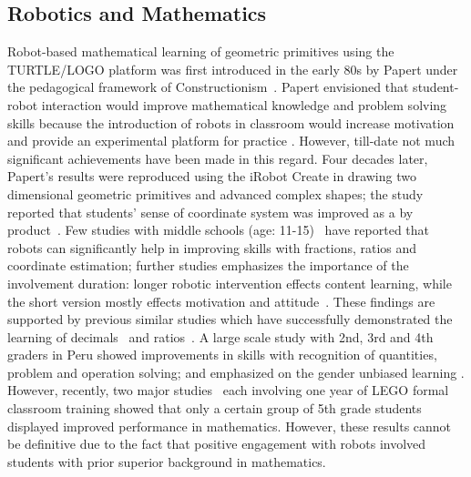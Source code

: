 \documentclass[conference]{IEEEtran}
\begin{document}
\subsection{Robotics and Mathematics}

Robot-based mathematical learning of geometric primitives using the TURTLE/LOGO platform was first introduced in the 
early 80s by Papert under the pedagogical framework of Constructionism~\cite{papert1980mindstorms}. Papert envisioned 
that student-robot interaction would improve mathematical knowledge and problem solving skills because the introduction 
of robots in classroom would increase motivation and provide an experimental platform for practice 
\cite{portsmore2004bringing, ruiz2004robotics, robinson2005robotics}. However, till-date not much significant 
achievements have been made in this regard. Four decades later, Papert's results were reproduced using the 
iRobot Create in drawing two dimensional geometric primitives and advanced complex shapes; the study reported that 
students' sense of coordinate system was improved as a by product~\cite{walker2012user}. Few studies with 
middle schools (age: 11-15)~\cite{nugent2008effect, nugent2009use} have reported that robots can significantly help 
in improving skills with fractions, ratios and coordinate estimation; further studies emphasizes the importance of 
the involvement duration: longer robotic intervention effects content learning, while the short version mostly 
effects motivation and attitude~\cite{nugent2010impact}. These findings are supported by previous similar studies which 
have successfully demonstrated the learning of decimals~\cite{portsmore2004bringing} and ratios~\cite{norton2004using, 
barker2007robotics}. A large scale study with 2nd, 3rd and 4th graders in Peru showed improvements in skills with 
recognition of quantities, problem and operation solving; and emphasized on the gender unbiased learning 
\cite{iturrizaga2000study}. However, recently, two major studies~\cite{hussain2006effect, lindh2007does} each involving 
one year of LEGO formal classroom training showed that only a certain group of 5th grade students displayed improved 
performance in mathematics. However, these results cannot be definitive due to the fact that positive engagement with 
robots involved students with prior superior background in mathematics.
\end{document}
